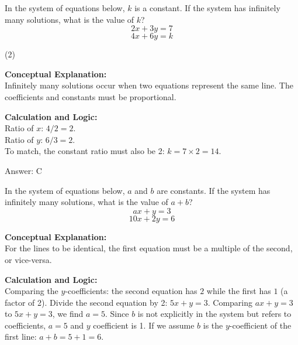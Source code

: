 \documentclass[11pt,paper=a4,answers]{exam}
\begin{document}
\begin{questions}
\pointsinrightmargin
\pointsdroppedatright
\marksnotpoints
{}
\pointformat{\boldmath\themarginpoints}
\bracketedpoints


\question
In the system of equations below, $k$ is a constant. If the system has infinitely many solutions, what is the value of $k$?
\[ 2x + 3y = 7 \]
\[ 4x + 6y = k \]
\begin{tasks}(2)
\end{tasks}

\begin{solution}
\textbf{Conceptual Explanation:} \\
Infinitely many solutions occur when two equations represent the same line. The coefficients and constants must be proportional.

\vspace{10pt}
\textbf{Calculation and Logic:} \\
Ratio of $x$: $4/2 = 2$. \\
Ratio of $y$: $6/3 = 2$. \\
To match, the constant ratio must also be 2: $k = 7 \times 2 = 14$.

\vspace{15pt}
Answer: \colorbox{yellow!100}{C}
\end{solution}

\question
In the system of equations below, $a$ and $b$ are constants. If the system has infinitely many solutions, what is the value of $a + b$?
\[ ax + y = 3 \]
\[ 10x + 2y = 6 \]

\begin{solution}
\textbf{Conceptual Explanation:} \\
For the lines to be identical, the first equation must be a multiple of the second, or vice-versa.

\vspace{10pt}
\textbf{Calculation and Logic:} \\
Comparing the $y$-coefficients: the second equation has $2$ while the first has $1$ (a factor of 2). 
Divide the second equation by 2: $5x + y = 3$.
Comparing $ax + y = 3$ to $5x + y = 3$, we find $a = 5$.
Since $b$ is not explicitly in the system but refers to coefficients, $a=5$ and $y$ coefficient is 1. If we assume $b$ is the $y$-coefficient of the first line: $a+b = 5+1 = 6$.


\end{solution}
\end{questions}
\end{document}

